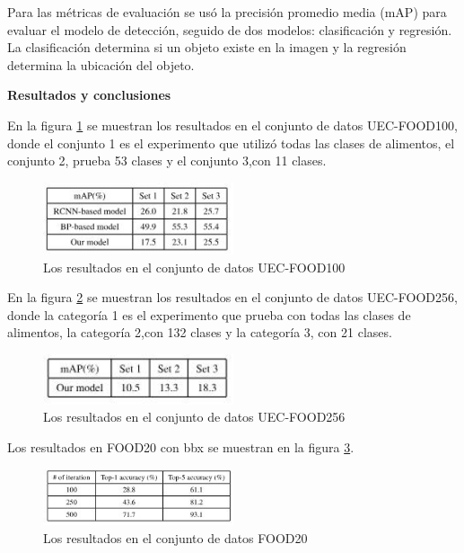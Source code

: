 \thinspace
Para las métricas de evaluación se usó la precisión promedio media (mAP) para evaluar el modelo de detección, seguido de dos modelos: clasificación y regresión. La clasificación determina si un objeto existe en la imagen y la regresión determina la ubicación del objeto.

\thinspace
\textbf{Resultados y conclusiones}

\thinspace
En la figura \ref{fig11} se muestran los resultados en el conjunto de datos UEC-FOOD100, donde el conjunto 1 es el experimento que utilizó todas las clases de alimentos, el conjunto 2, prueba 53 clases y el conjunto 3,con 11 clases.

\begin{figure}[h]
		\begin{center}
			\includegraphics[width=0.5\textwidth]{2/imagen2/11FIGURA11PAPER3.JPG}
	        \caption{Los resultados en el conjunto de datos UEC-FOOD100}
			\label{fig11}
		\end{center}
		
	\end{figure}

\thinspace
En la figura \ref{fig12} se muestran los resultados en el conjunto de datos UEC-FOOD256, donde la categoría 1 es el experimento que prueba con todas las clases de alimentos, la categoría 2,con 132 clases y la categoría 3, con 21 clases.

\begin{figure}[h]
		\begin{center}
			\includegraphics[width=0.5\textwidth]{2/imagen2/12FIGURA12PAPER3.JPG}
	        \caption{Los resultados en el conjunto de datos UEC-FOOD256}
			\label{fig12}
		\end{center}
		
	\end{figure}

\thinspace
Los resultados en FOOD20 con bbx se muestran en la figura \ref{fig13}.

\begin{figure}[h]
		\begin{center}
			\includegraphics[width=0.5\textwidth]{2/imagen2/13FIGURA13PAPER3.JPG}
	        \caption{Los resultados en el conjunto de datos FOOD20}
			\label{fig13}
		\end{center}
		
	\end{figure}

